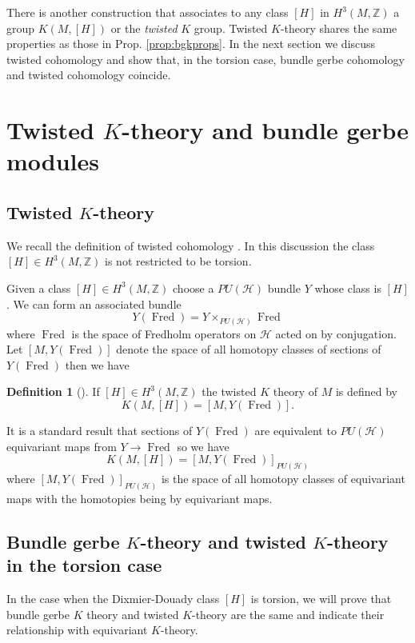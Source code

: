\documentclass[a4paper,reqno]{amsart}
\DeclareMathOperator{\Fred}{Fred}
\theoremstyle{plain}
\theoremstyle{definition}
\newtheorem{definition}[theorem]{Definition}
\theoremstyle{remark}
\numberwithin{equation}{section}
\numberwithin{figure}{section}
\newcommand{\cH}{{\mathcal H}}
\newcommand{\ZZ}{{\mathbb Z}}
\newcommand{\<}{\langle}
\renewcommand{\>}{\rangle}
\begin{document}
There is another  construction that associates to any class
$[H]$ in  $H^3(M, \ZZ)$ a group $K(M, [H])$ or the  {\em twisted}
$K$ group. Twisted
$K$-theory shares the same properties as those in Prop. \ref{prop:bgkprops}.
In the next section  we discuss twisted cohomology and show that,
in the torsion case, bundle gerbe cohomology and twisted cohomology
coincide.

\section{Twisted $K$-theory and bundle gerbe modules}

\subsection{Twisted $K$-theory}

We recall the definition  of twisted cohomology  \cite{Ros}.
In this discussion the class $[H] \in H^3(M, \ZZ)$ is
not restricted to be torsion.

Given a class $[H] \in H^3(M, \ZZ)$ choose a $PU(\cH)$ bundle $Y$ whose
class is $[H]$. We can form an associated bundle
$$
Y(\Fred) = Y \times_{PU(\cH)} \Fred
$$
where $\Fred$ is the space of Fredholm operators on $\cH$ acted
on by conjugation.  Let $[M, Y(\Fred)]$ denote the
space of all homotopy classes of sections of $Y(\Fred)$ then we have
\cite{Ros}
\begin{definition}[\cite{Ros}]
\label{def:twisted}
If $[H] \in H^3(M, \ZZ)$ the twisted $K$ theory
of $M$ is defined by
$$
K(M, [H]) = [M, Y(\Fred)].
$$
\end{definition}

It is a standard result that sections of $Y(\Fred)$ are equivalent
to $PU(\cH)$ equivariant maps from $Y \to \Fred$ so we have
\begin{equation*}
K(M, [H]) =[M, Y(\Fred)]_{PU(\cH)}
\end{equation*}
where $[M, Y(\Fred)]_{PU(\cH)}$ is the space
of all homotopy classes of equivariant maps with the homotopies
being by equivariant maps.


\subsection{Bundle gerbe  $K$-theory and twisted $K$-theory in the
torsion case}

In the case when the Dixmier-Douady class $[H]$ is torsion, we will
prove that bundle gerbe $K$ theory and twisted $K$-theory
are the same and indicate their relationship with equivariant
$K$-theory.
\end{document}
